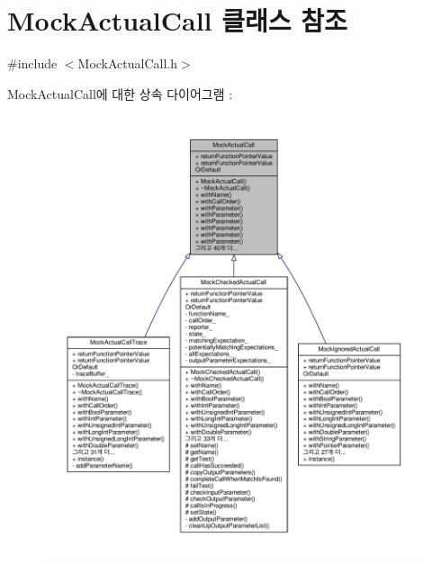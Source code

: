 \hypertarget{class_mock_actual_call}{}\section{Mock\+Actual\+Call 클래스 참조}
\label{class_mock_actual_call}


{\ttfamily \#include $<$Mock\+Actual\+Call.\+h$>$}



Mock\+Actual\+Call에 대한 상속 다이어그램 \+: 
\nopagebreak
\begin{figure}[H]
\begin{center}
\leavevmode
\includegraphics[width=350pt]{class_mock_actual_call__inherit__graph}
\end{center}
\end{figure}


